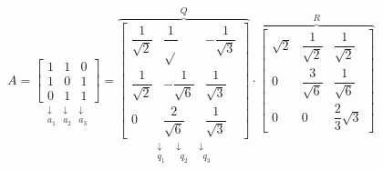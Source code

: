 $A=\underset{\begin{array}{ccc}
		\downarrow & \downarrow & \downarrow\\
		a_1 & a_2 & a_3
\end{array}}{\begin{bmatrix}
		1 & 1 & 0\\
		1 & 0 & 1\\
		0 & 1 & 1
\end{bmatrix}}=\overbrace{\underset{\begin{array}{ccc}
			\downarrow & \downarrow & \downarrow\\
			q_1 ~~&~~ q_2~~ &~~ q_3
	\end{array}}{\begin{bmatrix}
			\dfrac{1}{\sqrt{2}} & \dfrac{1}{\sqrt{}} & -\dfrac{1}{\sqrt{3}}\\
			\dfrac{1}{\sqrt{2}} & -\dfrac{1}{\sqrt{6}} & \dfrac{1}{\sqrt{3}}\\
			0 & \dfrac{2}{\sqrt{6}} & \dfrac{1}{\sqrt{3}}
\end{bmatrix}}}^{Q}\cdot\overbrace{\begin{bmatrix}
		\sqrt{2} & \dfrac{1}{\sqrt{2}} & \dfrac{1}{\sqrt{2}} \\ 
		0 & \dfrac{3}{\sqrt{6}} & \dfrac{1}{\sqrt{6}} \\ 
		0 & 0 & \dfrac{2}{3}\sqrt{3}
\end{bmatrix} }^R$
